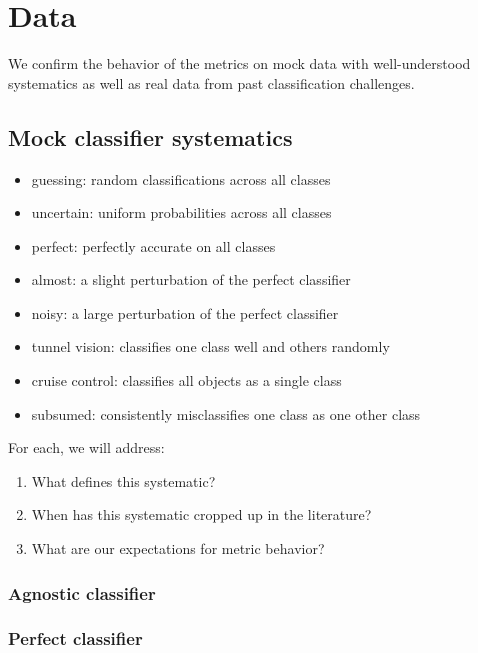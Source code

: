 \section{Data}
\label{sec:data}

We confirm the behavior of the metrics on mock data with well-understood systematics as well as real data from past classification challenges.

\subsection{Mock classifier systematics}
\label{sec:mockdata}

\begin{itemize}
\item    guessing: random classifications across all classes
\item    uncertain: uniform probabilities across all classes
\item    perfect: perfectly accurate on all classes
\item    almost: a slight perturbation of the perfect classifier
\item    noisy: a large perturbation of the perfect classifier
\item    tunnel vision: classifies one class well and others randomly
\item    cruise control: classifies all objects as a single class
\item    subsumed: consistently misclassifies one class as one other class
\end{itemize}

For each, we will address:
\begin{enumerate}
  \item What defines this systematic?
  \item When has this systematic cropped up in the literature?
  \item What are our expectations for metric behavior?
\end{enumerate}

\subsubsection{Agnostic classifier}
\label{sec:agnostic}

\subsubsection{Perfect classifier}
\label{sec:perfect}

